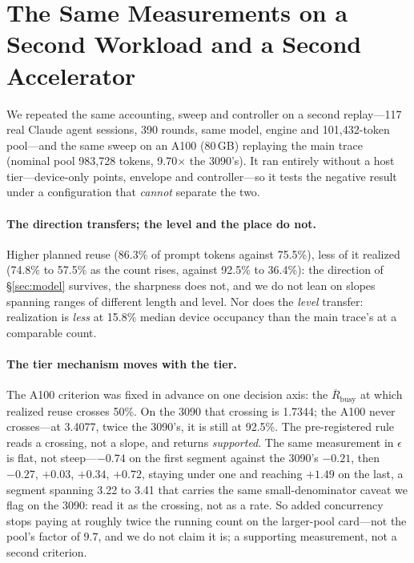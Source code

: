 \section{The Same Measurements on a Second Workload and a Second Accelerator}
\label{sec:xtrace}
\label{sec:a100}

We repeated the same accounting, sweep and controller on a second replay---117
real Claude agent sessions, 390 rounds, same model, engine and
101{,}432-token pool---and the same sweep on an A100 (80\,GB) replaying the main
trace (nominal pool 983{,}728 tokens, 9.70$\times$ the 3090's). It ran
entirely without a host tier---device-only points, envelope and controller---so it
tests the negative result under a configuration that \emph{cannot} separate the
two.

\paragraph{The direction transfers; the level and the place do not.} Higher
planned reuse (86.3\% of prompt tokens against 75.5\%), less of it realized
(74.8\% to 57.5\% as the count rises, against 92.5\% to 36.4\%): the direction of
\S\ref{sec:model} survives, the sharpness does not, and we do not lean on slopes
spanning ranges of different length and level. Nor does the \emph{level} transfer:
realization is \emph{less} at 15.8\% median device occupancy than the main trace's
at a comparable count.

\paragraph{The tier mechanism moves with the tier.} The A100 criterion was fixed in
advance on one decision axis: the $\overline{R}_{\text{busy}}$ at which realized
reuse crosses 50\%. On the 3090 that crossing is 1.7344; the A100 never crosses---at
3.4077, twice the 3090's, it is still at 92.5\%. The pre-registered rule reads a
crossing, not a slope, and returns \emph{supported}. The same measurement in
$\epsilon$ is flat, not steep---$-0.74$ on the first segment against the 3090's
$-0.21$, then $-0.27$, $+0.03$, $+0.34$, $+0.72$, staying under one and reaching $+1.49$
on the last, a segment spanning 3.22 to 3.41 that carries the same
small-denominator caveat we flag on the 3090: read it as the crossing, not as a
rate. So added concurrency stops paying at roughly twice the running count on the
larger-pool card---not the pool's factor of $9.7$, and we do not claim it is; a
supporting measurement, not a second criterion.

